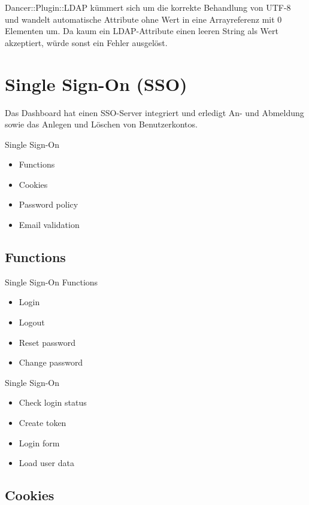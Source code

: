 Dancer::Plugin::LDAP kümmert sich um die korrekte Behandlung
von UTF-8 und wandelt automatische Attribute ohne Wert in eine
Arrayreferenz mit 0 Elementen um. Da kaum ein LDAP-Attribute einen
leeren String als Wert akzeptiert, würde sonst ein Fehler
ausgelöst.

\section{Single Sign-On (SSO)}

Das Dashboard hat einen SSO-Server integriert und erledigt An- und
Abmeldung sowie das Anlegen und Löschen von Benutzerkontos.

\begin{frame}{Single Sign-On}
\begin{itemize}
\item Functions
\item Cookies
\item Password policy
\item Email validation
\end{itemize}
\end{frame}

\subsection{Functions}

\begin{frame}{Single Sign-On Functions}
\begin{itemize}
\item Login
\item Logout
\item Reset password
\item Change password
\end{itemize}
\end{frame}

\begin{frame}{Single Sign-On}
\begin{itemize}
\item Check login status
\item Create token
\item Login form
\item Load user data
\end{itemize}
\end{frame}

\subsection{Cookies}

